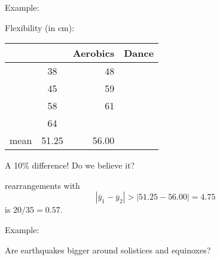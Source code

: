 \begin{frame}{Example: }

    Flexibility (in cm):  
    \begin{center}
      \begin{tabular}{rcrr}
        & & Aerobics & Dance \\
       \hline
       & 38  & 48 \\
       & 45  & 59 \\
       & 58  & 61 \\
       & 64  & \\
       \hline
       mean & 51.25 & 56.00 \\
     \end{tabular}
   \end{center}
     A 10\% difference!  Do we believe it?

     \vspace{2em}

     \pause

      rearrangements with
     \[
         | \bar y_1 - \bar y_2 | > |51.25-56.00| = 4.75
     \]
     is $20/35 = 0.57$.
 
\end{frame}


\begin{frame}{Example:}

    Are earthquakes bigger around solistices and equinoxes?

\end{frame}


